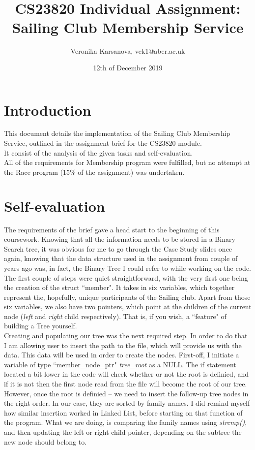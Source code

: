 \documentclass[a4paper,12pt]{article}
\title{CS23820 Individual Assignment: Sailing Club Membership Service}
\author{Veronika Karsanova, vek1@aber.ac.uk}
\date{12th of December 2019}
\begin{document}
\maketitle

\newpage

\section{Introduction}
This document details the implementation of the Sailing Club Membership Service, outlined in the assignment brief \cite{brief} for the CS23820 module.\\

It consist of the analysis of the given tasks and self-evaluation.\\

All of the requirements for Membership program were fulfilled, but no attempt at the Race program (15\% of the assignment) was undertaken.

\section{Self-evaluation} 

The requirements of the brief \cite{brief} gave a head start to the beginning of this coursework. Knowing that all the information needs to be stored in a Binary Search tree, it was obvious for me to go through the Case Study slides\cite{casestudy1}\cite{casestudy2} once again, knowing that the data structure used in the assignment from couple of years ago was, in fact, the Binary Tree I could refer to while working on the code. \\

The first couple of steps were quiet straightforward, with the very first one being the creation of the struct ``member". It takes in six variables, which together represent the, hopefully, unique participants of the Sailing club. Apart from those six variables, we also have two pointers, which point at the children of the current node (\emph{left} and \emph{right} child respectively). That is, if you wish, a ``feature" of building a Tree yourself. \\

Creating and populating our tree was the next required step. In order to do that I am allowing user to insert the path to the file, which will provide us with the data. This data will be used in order to create the nodes. First-off, I initiate a variable of type ``member\_node\_ptr" \emph{tree\_root} as a NULL. The if statement located a bit lower in the code will check whether or not the root is definied, and if it is not then the first node read from the file will become the root of our tree.  However, once the root is definied – we need to insert the follow-up tree nodes in the right order. In our case, they are sorted by family names. I did remind myself how similar insertion worked in Linked List\cite{worksheet4}, before starting on that function of the program. What we are doing, is comparing the family names using \emph{strcmp()}, and then updating the left or right child pointer, depending on the subtree the new node should belong to. \\
\end{document}
